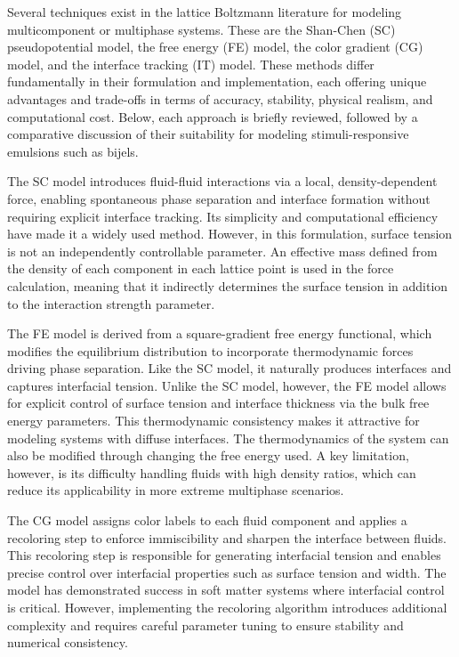 Several techniques exist in the lattice Boltzmann literature for modeling multicomponent or multiphase systems. These are the Shan-Chen (SC) 
pseudopotential model, the free energy (FE) model, the color gradient (CG) model, and the interface tracking (IT) model.
These methods differ fundamentally in their formulation and implementation, each offering unique advantages and trade-offs in terms of accuracy, 
stability, physical realism, and computational cost. Below, each approach is briefly reviewed, followed by a comparative discussion of their 
suitability for modeling stimuli-responsive emulsions such as bijels.

The SC model introduces fluid-fluid interactions via a local, density-dependent force, enabling spontaneous phase separation and interface 
formation without requiring explicit interface tracking. 
\cite{shan_lattice_1993, shan_simulation_1994, shan_multicomponent_1995, jansen_bijels_2011,gunther_timescales_2014}
Its simplicity and computational efficiency have made it a widely used method. However,
in this formulation, surface tension is not an independently controllable parameter. An effective mass defined from the density of each component
in each lattice point is used in the force calculation, meaning that it indirectly determines the surface tension in addition to the interaction
strength parameter.

The FE model is derived from a square-gradient free energy functional, which modifies the equilibrium distribution to incorporate thermodynamic 
forces driving phase separation. \cite{swift_lattice_1996, kendon_inertial_2001, briant_lattice_2004} Like the SC model, it naturally produces interfaces and captures interfacial tension. Unlike the SC model, however, 
the FE model allows for explicit control of surface tension and interface thickness via the bulk free energy parameters. This thermodynamic 
consistency makes it attractive for modeling systems with diffuse interfaces. The thermodynamics of the system can also be modified through changing the free energy used.
\cite{swift_lattice_1996, briant_lattice_2004, kendon_inertial_2001}
A key limitation, however, is its difficulty handling fluids with high density ratios, which can reduce its applicability in more extreme multiphase scenarios.

The CG model assigns color labels to each fluid component and applies a recoloring step to enforce immiscibility and sharpen the interface 
between fluids. 
\cite{mora_optimal_2021, latva-kokko_static_2005, huang_study_2014, liu_multiphase_2016}
This recoloring step is responsible for generating interfacial tension and enables precise control over interfacial properties such 
as surface tension and width. The model has demonstrated success in soft matter systems where interfacial control is critical. However, implementing 
the recoloring algorithm introduces additional complexity and requires careful parameter tuning to ensure stability and numerical consistency. \cite{mora_optimal_2021}

